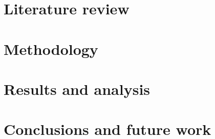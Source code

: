 \documentclass[12pt]{report} %
\begin{document}
\section{Literature review}

\newpage
\section{Methodology}

\newpage
\section{Results and analysis}

\newpage
\section{Conclusions and future work}

\printbibliography
\end{document}
